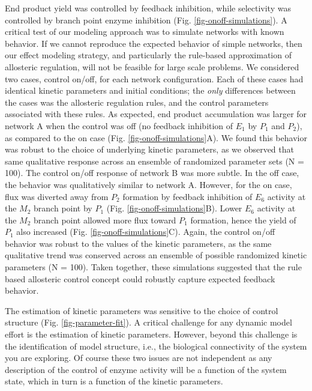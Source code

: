 \documentclass[12pt]{article}
\begin{document}
End product yield was controlled by feedback inhibition, while selectivity was controlled by branch point enzyme inhibition (Fig. \ref{fig-onoff-simulations}).
A critical test of our modeling approach was to simulate networks with known behavior. If we cannot reproduce the expected behavior of simple networks, then our
effect modeling strategy, and particularly the rule-based approximation of allosteric regulation, will not be feasible for large scale problems.
We considered two cases,  control on/off, for each network configuration. 
Each of these cases had identical kinetic parameters and initial conditions; 
the \textit{only} differences between the cases was the allosteric regulation rules, and the control parameters associated with these rules. 
As expected, end product accumulation was larger for network A when the control was off (no feedback inhibition of $E_{1}$ by $P_{1}$ and $P_{2}$),
as compared to the on case (Fig. \ref{fig-onoff-simulations}A). We found this behavior was robust to the choice of underlying kinetic parameters, 
as we observed that same qualitative response across an ensemble of randomized parameter sets (N = 100). 
The control on/off response of network B was more subtle. In the off case, the behavior was qualitatively similar to network A. 
However, for the on case, flux was diverted away from $P_{2}$ formation by feedback inhibition of $E_{6}$ activity at the $M_{2}$ branch point by $P_{1}$ (Fig. \ref{fig-onoff-simulations}B).
Lower $E_{6}$ activity at the $M_{2}$ branch point allowed more flux toward $P_{1}$ formation, hence the yield of $P_{1}$ also increased (Fig. \ref{fig-onoff-simulations}C).
Again, the control on/off behavior was robust to the values of the kinetic parameters, as the same qualitative trend was conserved across 
an ensemble of possible randomized kinetic parameters (N = 100). Taken together, these simulations suggested that the rule based allosteric control 
concept could robustly capture expected feedback behavior.

The estimation of kinetic parameters was sensitive to the choice of control structure (Fig. \ref{fig-parameter-fit}).
A critical challenge for any dynamic model effort is the estimation of kinetic parameters. 
However, beyond this challenge is the identification of model structure, i.e., the biological connectivity of the system you are exploring.
Of course these two issues are not independent as any description of the control of enzyme activity will be a function of the system state, which
in turn is a function of the kinetic parameters.
\end{document}
